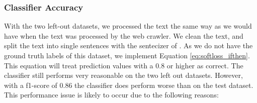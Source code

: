 \documentclass[a4paper, 12pt, oneside]{book} %
\begin{document}
\subsubsection{Classifier Accuracy}
With the two left-out datasets, we processed the text the same way as we would have when the text was processed by the web crawler. 
We clean the text, and split the text into single sentences with the sentecizer of \textcite{honnibal_spacy_2020}.
As we do not have the ground truth labels of this dataset, we implement Equation \ref{eq:softloss_ifthen}.
This equation will treat prediction values with a 0.8 or higher as correct.
The classifier still performs very reasonable on the two left out datasets.
However, with a f1-score of 0.86 the classifier does perform worse than on the test dataset.
This performance issue is likely to occur due to the following reasons:
\end{document}
